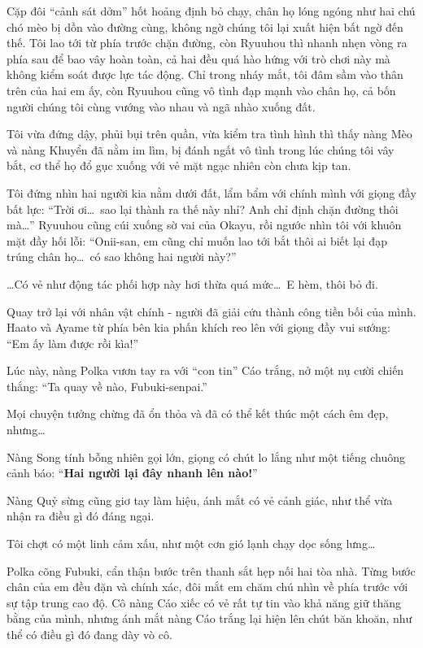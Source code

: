 \documentclass[../main.tex]{subfiles}
\begin{document}
Cặp đôi ``cảnh sát dởm'' hốt hoảng định bỏ chạy, chân họ lóng ngóng như hai chú chó mèo bị dồn vào đường cùng, không ngờ chúng tôi lại xuất hiện bất ngờ đến thế. Tôi lao tới từ phía trước chặn đường, còn Ryuuhou thì nhanh nhẹn vòng ra phía sau để bao vây hoàn toàn, cả hai đều quá hào hứng với trò chơi này mà không kiểm soát được lực tác động. Chỉ trong nháy mắt, tôi đâm sầm vào thân trên của hai em ấy, còn Ryuuhou cũng vô tình đạp mạnh vào chân họ, cả bốn người chúng tôi cùng vướng vào nhau và ngã nhào xuống đất.

Tôi vừa đứng dậy, phủi bụi trên quần, vừa kiểm tra tình hình thì thấy nàng Mèo và nàng Khuyển đã nằm im lìm, bị đánh ngất vô tình trong lúc chúng tôi vây bắt, cơ thể họ đổ gục xuống với vẻ mặt ngạc nhiên còn chưa kịp tan.

Tôi đứng nhìn hai người kia nằm dưới đất, lẩm bẩm với chính mình với giọng đầy bất lực: ``Trời ơi\dots\ sao lại thành ra thế này nhỉ? Anh chỉ định chặn đường thôi mà\dots'' Ryuuhou cũng cúi xuống sờ vai của Okayu, rồi ngước nhìn tôi với khuôn mặt đầy hối lỗi: ``Onii-san, em cũng chỉ muốn lao tới bắt thôi ai biết lại đạp trúng chân họ\dots\ có sao không hai người này?''

\dots Có vẻ như động tác phối hợp này hơi thừa quá mức\dots\ E hèm, thôi bỏ đi.

Quay trở lại với nhân vật chính - người đã giải cứu thành công tiền bối của mình. Haato và Ayame từ phía bên kia phấn khích reo lên với giọng đầy vui sướng: ``Em ấy làm được rồi kìa!''

Lúc này, nàng Polka vươn tay ra với ``con tin'' Cáo trắng, nở một nụ cười chiến thắng: ``Ta quay về nào, Fubuki-senpai.''

Mọi chuyện tưởng chừng đã ổn thỏa và đã có thể kết thúc một cách êm đẹp, nhưng\dots

Nàng Song tính bỗng nhiên gọi lớn, giọng có chút lo lắng như một tiếng chuông cảnh báo: ``\textbf{Hai người lại đây nhanh lên nào!}''

Nàng Quỷ sừng cũng giơ tay làm hiệu, ánh mắt có vẻ cảnh giác, như thể vừa nhận ra điều gì đó đáng ngại.

Tôi chợt có một linh cảm xấu, như một cơn gió lạnh chạy dọc sống lưng\dots

\pov{-}

Polka cõng Fubuki, cẩn thận bước trên thanh sắt hẹp nối hai tòa nhà. Từng bước chân của em đều đặn và chính xác, đôi mắt em chăm chú nhìn về phía trước với sự tập trung cao độ. Cô nàng Cáo xiếc có vẻ rất tự tin vào khả năng giữ thăng bằng của mình, nhưng ánh mắt nàng Cáo trắng lại hiện lên chút băn khoăn, như thể có điều gì đó đang dày vò cô.
\end{document}

